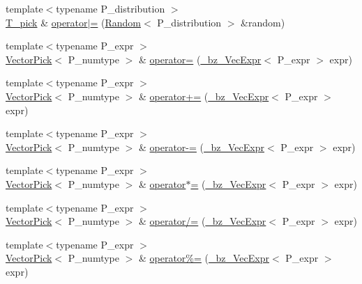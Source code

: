 \begin{DoxyCompactItemize}
\item 
{\footnotesize template$<$typename P\+\_\+distribution $>$ }\\\hyperlink{classVectorPick_ab257fd713ce0f2a81bc79059cec93ac9}{T\+\_\+pick} \& \hyperlink{classVectorPick_a829807a818de91487101f3cba38bfd8d}{operator$\vert$=} (\hyperlink{classRandom}{Random}$<$ P\+\_\+distribution $>$ \&random)
\item 
{\footnotesize template$<$typename P\+\_\+expr $>$ }\\\hyperlink{classVectorPick}{Vector\+Pick}$<$ P\+\_\+numtype $>$ \& \hyperlink{classVectorPick_ab00e7126ecb216bbee46f908b844e72c}{operator=} (\hyperlink{class__bz__VecExpr}{\+\_\+bz\+\_\+\+Vec\+Expr}$<$ P\+\_\+expr $>$ expr)
\item 
{\footnotesize template$<$typename P\+\_\+expr $>$ }\\\hyperlink{classVectorPick}{Vector\+Pick}$<$ P\+\_\+numtype $>$ \& \hyperlink{classVectorPick_a7be39ec8ec5cb7f7ebc6bf42f9671e60}{operator+=} (\hyperlink{class__bz__VecExpr}{\+\_\+bz\+\_\+\+Vec\+Expr}$<$ P\+\_\+expr $>$ expr)
\item 
{\footnotesize template$<$typename P\+\_\+expr $>$ }\\\hyperlink{classVectorPick}{Vector\+Pick}$<$ P\+\_\+numtype $>$ \& \hyperlink{classVectorPick_a3be78b53726247c89a509a9f7612fd65}{operator-\/=} (\hyperlink{class__bz__VecExpr}{\+\_\+bz\+\_\+\+Vec\+Expr}$<$ P\+\_\+expr $>$ expr)
\item 
{\footnotesize template$<$typename P\+\_\+expr $>$ }\\\hyperlink{classVectorPick}{Vector\+Pick}$<$ P\+\_\+numtype $>$ \& \hyperlink{classVectorPick_a7de052a7adeda8578df67b49090b991c}{operator$\ast$=} (\hyperlink{class__bz__VecExpr}{\+\_\+bz\+\_\+\+Vec\+Expr}$<$ P\+\_\+expr $>$ expr)
\item 
{\footnotesize template$<$typename P\+\_\+expr $>$ }\\\hyperlink{classVectorPick}{Vector\+Pick}$<$ P\+\_\+numtype $>$ \& \hyperlink{classVectorPick_ade74b29d4b6f207c7b0afb2b3e0ea807}{operator/=} (\hyperlink{class__bz__VecExpr}{\+\_\+bz\+\_\+\+Vec\+Expr}$<$ P\+\_\+expr $>$ expr)
\item 
{\footnotesize template$<$typename P\+\_\+expr $>$ }\\\hyperlink{classVectorPick}{Vector\+Pick}$<$ P\+\_\+numtype $>$ \& \hyperlink{classVectorPick_a9861ad49dc5b4025464bb6a464181db5}{operator\%=} (\hyperlink{class__bz__VecExpr}{\+\_\+bz\+\_\+\+Vec\+Expr}$<$ P\+\_\+expr $>$ expr)
\item 

\end{DoxyCompactItemize}
